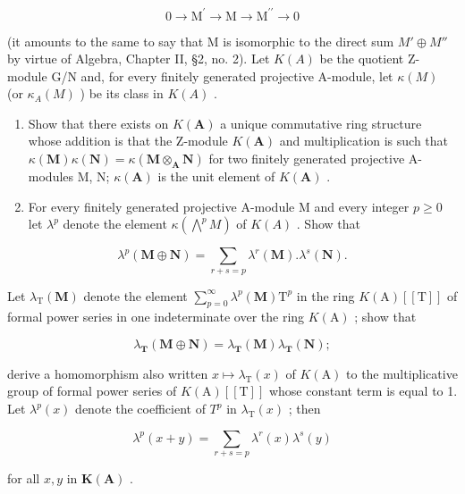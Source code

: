 \[
0 \rightarrow \mathrm{M} ^ {\prime} \rightarrow \mathrm{M} \rightarrow \mathrm{M} ^ {\prime \prime} \rightarrow 0
\]

(it amounts to the same to say that M is isomorphic to the direct sum \(M' \oplus M''\) by virtue of Algebra, Chapter II, §2, no. 2). Let \(K(A)\) be the quotient Z-module G/N and, for every finitely generated projective A-module, let \(\kappa(M)\) (or \(\kappa_{A}(M)\) ) be its class in \(K(A)\) .

\begin{enumerate}
\def\labelenumi{(\alph{enumi})}
\item
  Show that there exists on \(K(\mathbf{A})\) a unique commutative ring structure whose addition is that the Z-module \(K(\mathbf{A})\) and multiplication is such that \(\kappa(\mathbf{M})\kappa(\mathbf{N}) = \kappa(\mathbf{M} \otimes_{\mathbf{A}} \mathbf{N})\) for two finitely generated projective A-modules M, N; \(\kappa(\mathbf{A})\) is the unit element of \(K(\mathbf{A})\) .
\item
  For every finitely generated projective A-module M and every integer \(p \geqslant 0\) let \(\lambda^p\) denote the element \(\kappa(\bigwedge^p M)\) of \(K(A)\) . Show that
\end{enumerate}

\[
\lambda^ {p} (\mathbf {M} \oplus \mathbf {N}) = \sum_ {r + s = p} \lambda^ {r} (\mathbf {M}). \lambda^ {s} (\mathbf {N}).
\]

Let \(\lambda_{\mathrm{T}}(\mathbf{M})\) denote the element \(\sum_{p=0}^{\infty} \lambda^{p}(\mathbf{M}) \mathrm{T}^{p}\) in the ring \(K(\mathrm{A})[[\mathrm{T}]]\) of formal power series in one indeterminate over the ring \(K(\mathrm{A})\) ; show that

\[
\lambda_ {\mathbf {T}} (\mathbf {M} \oplus \mathbf {N}) = \lambda_ {\mathbf {T}} (\mathbf {M}) \lambda_ {\mathbf {T}} (\mathbf {N});
\]

derive a homomorphism also written \(x \mapsto \lambda_{\mathrm{T}}(x)\) of \(K(\mathrm{A})\) to the multiplicative group of formal power series of \(K(\mathrm{A})[[\mathrm{T}]]\) whose constant term is equal to 1. Let \(\lambda^{p}(x)\) denote the coefficient of \(T^{p}\) in \(\lambda_{\mathrm{T}}(x)\) ; then

\[
\lambda^ {p} (x + y) = \sum_ {r + s = p} \lambda^ {r} (x) \lambda^ {s} (y)
\]

for all \(x, y\) in \(\mathbf{K}(\mathbf{A})\) .

